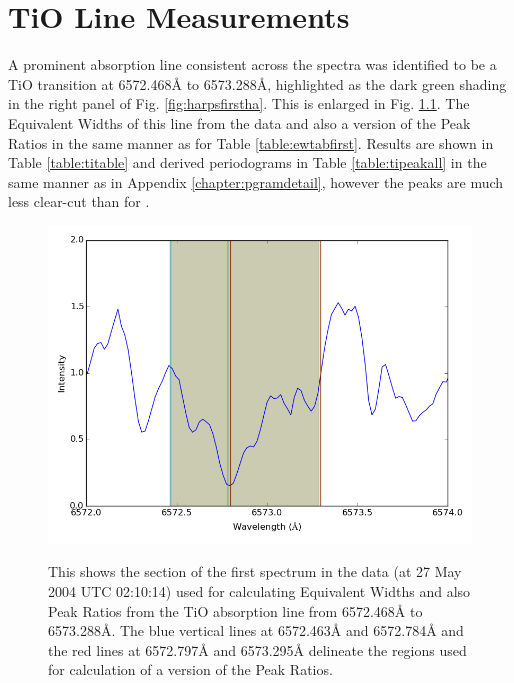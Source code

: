 \chapter{TiO Line Measurements} %
\protect\label{chapter:tioline}

A prominent absorption line consistent across the spectra was identified to be a TiO transition at 6572.468{\AA} to
6573.288{\AA}, highlighted as the dark green shading in the right panel of Fig. \ref{fig:harpsfirstha}. This is enlarged
in Fig. \ref{fig:tispec}. The Equivalent Widths of this line from the {\harps} data and also a version of the Peak
Ratios in the same manner as for Table \ref{table:ewtabfirst}. Results are shown in Table \ref{table:titable} and
derived periodograms in Table \ref{table:tipeakall} in the same manner as in Appendix \ref{chapter:pgramdetail}, however
the peaks are much less clear-cut than for \ha.

\begin{figure}[!htbp]
\begin{center}
\includegraphics[scale=0.25]{Figures/tispec.png} \\
\end{center}   
\caption{This shows the section of the first spectrum in the {\harps} data (at 27 May 2004 UTC 02:10:14) used for
  calculating Equivalent Widths and also Peak Ratios from the TiO absorption line from 6572.468{\AA} to
  6573.288{\AA}. The blue vertical lines at 6572.463{\AA} and 6572.784{\AA} and the red lines at 6572.797{\AA} and
  6573.295{\AA} delineate the regions used for calculation of a version of the Peak Ratios.}
\protect\label{fig:tispec}
\end{figure}

